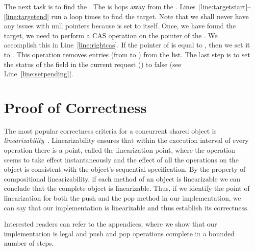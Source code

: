 \documentclass{llncs}
\begin{document}
\begin{comment}
We define a global atomic
variable, . If a delete is not pending 
on , we read its contents, and try to perform a CAS operation on it. We try to atomically
replace its current contents with the argument, . Note that at this stage, only one set of threads
will be successful. Beyond this point, all the threads will be working on the same DeleteRequest. 
They will then move on to call the  function that will finish the delete request. 
For threads that are not successful in the CAS operation, or threads that find that the current request
contained in  has a delete pending will also call the  function. This 
is required to ensure wait freedom. 
\end{comment}

The next task is to find the . The  is  hops away from the .
Lines~\ref{line:targetstart}--\ref{line:targetend} run a loop  times to find the target. Note that we shall never
have any issues with null pointers because  is set to  itself. Once, we have found the
target, we need to perform a CAS operation on the  pointer of the . We accomplish this in
Line~\ref{line:rightcas}. If the  pointer of  is equal to , then we set it to .
This operation removes  entries (from  to ) from the list. The last step is to set the 
status of the  field in the current request () to false (see Line~\ref{line:setpending}).




\section{Proof of Correctness}
\vspace{-3mm}
The most popular correctness criteria for a concurrent shared object is {\em
linearizability}~\cite{linearizability}. Linearizability ensures that within the execution interval of every operation
there is a point, called the linearization point, where the operation seems to
take effect instantaneously and the effect of all the operations on the object
is consistent with the object's sequential specification. 
By the property of compositional linearizability, if each method of an object is linearizable we can 
conclude that the complete object is linearizable.
Thus, if we identify the point of linearization for both the push and the pop method in our implementation, 
we can say that our implementation is linearizable and thus establish its correctness.

Interested readers can refer to the appendices, where we show that our 
implementation is legal and push and pop operations complete in a bounded number of steps.
\end{document}
